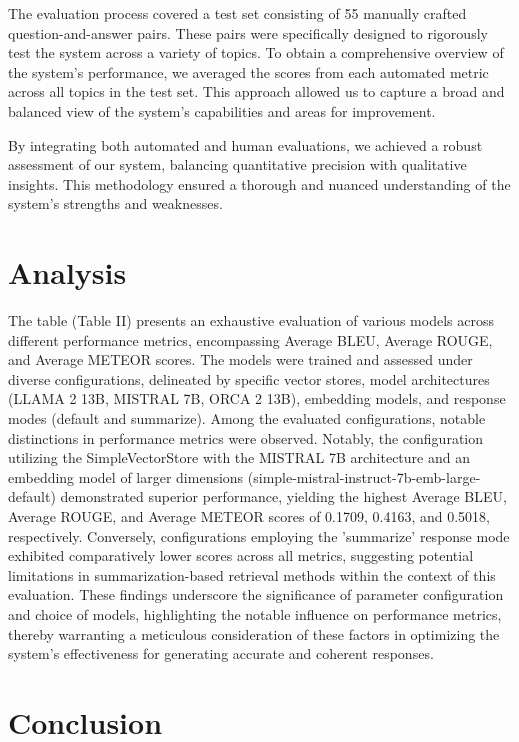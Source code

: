 \documentclass[conference, 11pt]{IEEEtran}
\begin{document}
The evaluation process covered a test set consisting of 55 manually crafted question-and-answer pairs. These pairs were specifically designed to rigorously test the system across a variety of topics. To obtain a comprehensive overview of the system's performance, we averaged the scores from each automated metric across all topics in the test set. This approach allowed us to capture a broad and balanced view of the system's capabilities and areas for improvement.

By integrating both automated and human evaluations, we achieved a robust assessment of our system, balancing quantitative precision with qualitative insights. This methodology ensured a thorough and nuanced understanding of the system's strengths and weaknesses.

\section{Analysis}

The table (Table II) presents an exhaustive evaluation of various models across different performance metrics, encompassing Average BLEU, Average ROUGE, and Average METEOR scores. The models were trained and assessed under diverse configurations, delineated by specific vector stores, model architectures (LLAMA 2 13B, MISTRAL 7B, ORCA 2 13B), embedding models, and response modes (default and summarize). Among the evaluated configurations, notable distinctions in performance metrics were observed. Notably, the configuration utilizing the SimpleVectorStore with the MISTRAL 7B architecture and an embedding model of larger dimensions (simple-mistral-instruct-7b-emb-large-default) demonstrated superior performance, yielding the highest Average BLEU, Average ROUGE, and Average METEOR scores of 0.1709, 0.4163, and 0.5018, respectively. Conversely, configurations employing the 'summarize' response mode exhibited comparatively lower scores across all metrics, suggesting potential limitations in summarization-based retrieval methods within the context of this evaluation. These findings underscore the significance of parameter configuration and choice of models, highlighting the notable influence on performance metrics, thereby warranting a meticulous consideration of these factors in optimizing the system's effectiveness for generating accurate and coherent responses.

\section{Conclusion}
\end{document}
